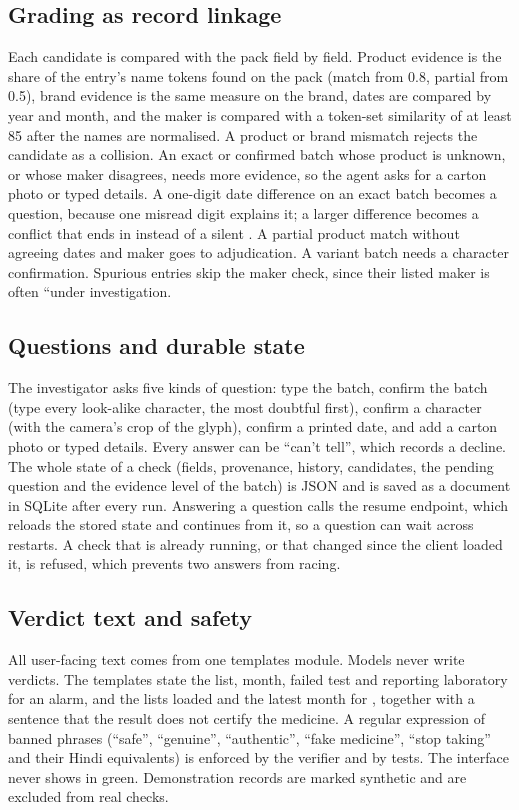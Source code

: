 \subsection{Grading as record linkage}
Each candidate is compared with the pack field by field. Product evidence is the share of the entry's name tokens found on the pack (match from 0.8, partial from 0.5), brand evidence is the same measure on the brand, dates are compared by year and month, and the maker is compared with a token-set similarity of at least 85 after the names are normalised. A product or brand mismatch rejects the candidate as a collision. An exact or confirmed batch whose product is unknown, or whose maker disagrees, needs more evidence, so the agent asks for a carton photo or typed details. A one-digit date difference on an exact batch becomes a question, because one misread digit explains it; a larger difference becomes a conflict that ends in \CANTV{} instead of a silent \NLISTED. A partial product match without agreeing dates and maker goes to adjudication. A variant batch needs a character confirmation. Spurious entries skip the maker check, since their listed maker is often ``under investigation.

\subsection{Questions and durable state}
The investigator asks five kinds of question: type the batch, confirm the batch (type every look-alike character, the most doubtful first), confirm a character (with the camera's crop of the glyph), confirm a printed date, and add a carton photo or typed details. Every answer can be ``can't tell'', which records a decline. The whole state of a check (fields, provenance, history, candidates, the pending question and the evidence level of the batch) is JSON and is saved as a document in SQLite after every run. Answering a question calls the resume endpoint, which reloads the stored state and continues from it, so a question can wait across restarts. A check that is already running, or that changed since the client loaded it, is refused, which prevents two answers from racing.

\subsection{Verdict text and safety}
All user-facing text comes from one templates module. Models never write verdicts. The templates state the list, month, failed test and reporting laboratory for an alarm, and the lists loaded and the latest month for \NLISTED, together with a sentence that the result does not certify the medicine. A regular expression of banned phrases (``safe'', ``genuine'', ``authentic'', ``fake medicine'', ``stop taking'' and their Hindi equivalents) is enforced by the verifier and by tests. The interface never shows \NLISTED{} in green. Demonstration records are marked synthetic and are excluded from real checks.

